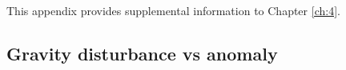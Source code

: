 
\clearpage





\chapter{} \label{appendix:C}

This appendix provides supplemental information to Chapter \ref{ch:4}. 

\section{Gravity disturbance vs anomaly}

